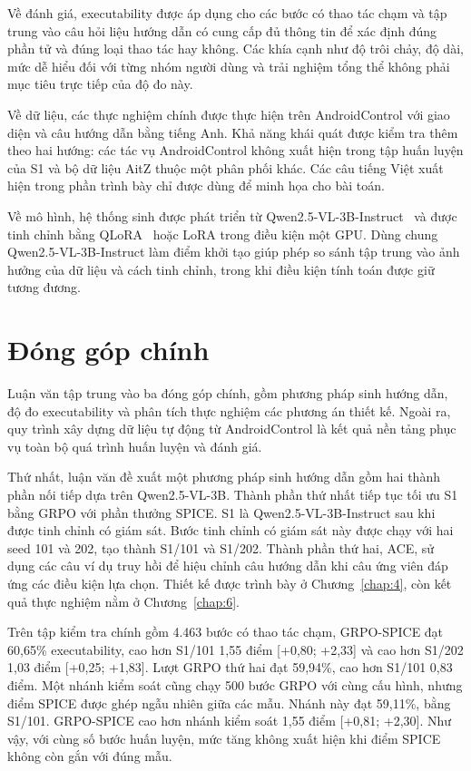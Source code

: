 Về đánh giá, executability được áp dụng cho các bước có thao tác chạm và tập trung vào câu hỏi liệu hướng dẫn có cung cấp đủ thông tin để xác định đúng phần tử và đúng loại thao tác hay không. Các khía cạnh như độ trôi chảy, độ dài, mức dễ hiểu đối với từng nhóm người dùng và trải nghiệm tổng thể không phải mục tiêu trực tiếp của độ đo này.

Về dữ liệu, các thực nghiệm chính được thực hiện trên AndroidControl với giao diện và câu hướng dẫn bằng tiếng Anh. Khả năng khái quát được kiểm tra thêm theo hai hướng: các tác vụ AndroidControl không xuất hiện trong tập huấn luyện của S1 và bộ dữ liệu AitZ thuộc một phân phối khác. Các câu tiếng Việt xuất hiện trong phần trình bày chỉ được dùng để minh họa cho bài toán.

Về mô hình, hệ thống sinh được phát triển từ Qwen2.5-VL-3B-Instruct~\cite{qwen25vl} và được tinh chỉnh bằng QLoRA~\cite{qlora} hoặc LoRA trong điều kiện một GPU. Dùng chung Qwen2.5-VL-3B-Instruct làm điểm khởi tạo giúp phép so sánh tập trung vào ảnh hưởng của dữ liệu và cách tinh chỉnh, trong khi điều kiện tính toán được giữ tương đương.

\section{Đóng góp chính}\label{sec:1.6}

Luận văn tập trung vào ba đóng góp chính, gồm phương pháp sinh hướng dẫn, độ đo executability và phân tích thực nghiệm các phương án thiết kế. Ngoài ra, quy trình xây dựng dữ liệu tự động từ AndroidControl là kết quả nền tảng phục vụ toàn bộ quá trình huấn luyện và đánh giá.

Thứ nhất, luận văn đề xuất một phương pháp sinh hướng dẫn gồm hai thành phần nối tiếp dựa trên Qwen2.5-VL-3B. Thành phần thứ nhất tiếp tục tối ưu S1 bằng GRPO với phần thưởng SPICE. S1 là Qwen2.5-VL-3B-Instruct sau khi được tinh chỉnh có giám sát. Bước tinh chỉnh có giám sát này được chạy với hai seed 101 và 202, tạo thành S1/101 và S1/202. Thành phần thứ hai, ACE, sử dụng các câu ví dụ truy hồi để hiệu chỉnh câu hướng dẫn khi câu ứng viên đáp ứng các điều kiện lựa chọn. Thiết kế được trình bày ở Chương~\ref{chap:4}, còn kết quả thực nghiệm nằm ở Chương~\ref{chap:6}.

Trên tập kiểm tra chính gồm 4.463 bước có thao tác chạm, GRPO-SPICE đạt 60,65\% executability, cao hơn S1/101 1,55 điểm [+0,80; +2,33] và cao hơn S1/202 1,03 điểm [+0,25; +1,83]. Lượt GRPO thứ hai đạt 59,94\%, cao hơn S1/101 0,83 điểm. Một nhánh kiểm soát cũng chạy 500 bước GRPO với cùng cấu hình, nhưng điểm SPICE được ghép ngẫu nhiên giữa các mẫu. Nhánh này đạt 59,11\%, bằng S1/101. GRPO-SPICE cao hơn nhánh kiểm soát 1,55 điểm [+0,81; +2,30]. Như vậy, với cùng số bước huấn luyện, mức tăng không xuất hiện khi điểm SPICE không còn gắn với đúng mẫu.

